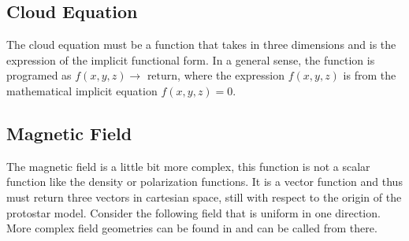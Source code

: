\documentclass[letterpaper,10pt,english]{sphinxmanual}
\begin{document}
%
\begin{sphinxVerbatim}[commandchars=\\\{\}]
   
   

  
\end{sphinxVerbatim}


\subsection{Cloud Equation}
\label{\detokenize{quickstart:cloud-equation}}
The cloud equation must be a function that takes in three dimensions and is the expression of the implicit functional form. In a general sense, the function is programed as \(f(x,y,z) \to \text{ return}\), where the expression
\(f(x,y,z)\) is from the mathematical implicit equation \(f(x,y,z) = 0\).

%
\begin{sphinxVerbatim}[commandchars=\\\{\}]
 
      
           
\end{sphinxVerbatim}


\subsection{Magnetic Field}
\label{\detokenize{quickstart:magnetic-field}}
The magnetic field is a little bit more complex, this function is not a scalar function like the density or polarization functions. It is a vector function and thus must return three vectors in cartesian space, still with respect to the origin of the protostar model. Consider the following field that is uniform in one direction. More complex field geometries can be found in {\hyperref[\detokenize{magnetic_field_functions_3d:module-magnetic_field_functions_3d}]{}} and can be called from there.
\end{document}

